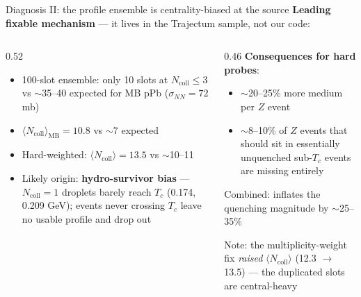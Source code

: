 \documentclass[aspectratio=169]{beamer}
\newcommand{\bad}[1]{{\color{red!70!black}#1}}
\begin{document}
\begin{frame}[t]{Diagnosis II: the profile ensemble is centrality-biased at the source}
  \textbf{Leading fixable mechanism} --- it lives in the Trajectum sample, not our code:
  \vspace{0.3em}
  \begin{columns}[T]
    \begin{column}{0.52\textwidth}
      \begin{itemize}
        \item 100-slot ensemble: only \bad{10 slots at $N_\mathrm{coll} \le 3$}\\
              vs $\sim$35--40 expected for MB pPb ($\sigma_{NN}=72$ mb)
        \item $\langle N_\mathrm{coll}\rangle_\mathrm{MB} = 10.8$ vs $\sim$7 expected
        \item Hard-weighted: $\langle N_\mathrm{coll}\rangle = 13.5$ vs $\sim$10--11
        \item Likely origin: \textbf{hydro-survivor bias} --- $N_\mathrm{coll}=1$ droplets barely reach $T_c$ (0.174, 0.209 GeV); events never crossing $T_c$ leave no usable profile and drop out
      \end{itemize}
    \end{column}
    \begin{column}{0.46\textwidth}
      \textbf{Consequences for hard probes}:
      \begin{itemize}
        \item $\sim$20--25\% more medium per $Z$ event
        \item $\sim$8--10\% of $Z$ events that should sit in essentially unquenched sub-$T_c$ events are missing entirely
      \end{itemize}
      \vspace{0.4em}
      \bad{Combined: inflates the quenching magnitude by $\sim$25--35\%}
      \vspace{0.4em}

      Note: the multiplicity-weight fix \emph{raised} $\langle N_\mathrm{coll}\rangle$ (12.3 $\to$ 13.5) --- the duplicated slots are central-heavy
    \end{column}
  \end{columns}
\end{frame}
\end{document}
